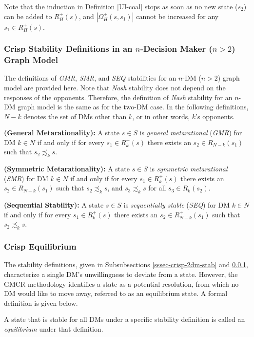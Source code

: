 Note that the induction in Definition \ref{UI-coal} stops as soon as no new state ($s_2$) can be added to $R_H^+(s)$, and $|\Omega_H^+(s, s_1)|$ cannot be increased for any $s_1 \in R_H^+(s)$.

\subsubsection{Crisp Stability Definitions in an $n$-Decision Maker ($n>2$) Graph Model}\label{sssec-crisp-n-dm-stab}

The definitions of \emph{GMR}, \emph{SMR}, and \emph{SEQ} stabilities for an $n$-DM ($n>2$) graph model are provided here. Note that \emph{Nash} stability does not depend on the responses of the opponents. Therefore, the definition of \emph{Nash} stability for an $n$-DM graph model is the same as for the two-DM case. In the following definitions, $N-k$ denotes the set of DMs other than $k$, or in other words, $k$'s opponents.

\begin{definition}\label{def-gmr}
\rm {\bf (General Metarationality):} A state $s \in S$ is \emph{general metarational} (\emph{GMR}) for DM $k \in N$ if and only if for every $s_1 \in R_k^+(s)$ there exists an $s_2 \in R_{N-k}(s_1)$ such that $s_2 \precsim_k s$.
\end{definition}

\begin{definition}\label{def-smr}
\rm {\bf (Symmetric Metarationality):} A state $s \in S$ is \emph{symmetric metarational} (\emph{SMR}) for DM $k \in N$ if and only if for every $s_1 \in R_k^+(s)$ there exists an $s_2 \in R_{N-k}(s_1)$ such that $s_2 \precsim_k s$, and $s_3 \precsim_k s$ for all $s_3 \in R_k(s_2)$.
\end{definition}

\begin{definition}\label{def-seq}
\rm {\bf (Sequential Stability):} A state $s \in S$ is \emph{sequentially stable} (\emph{SEQ}) for DM $k \in N$ if and only if for every $s_1 \in R_k^+(s)$ there exists an $s_2 \in R_{N-k}^+(s_1)$ such that $s_2 \precsim_k s$.
\end{definition}

\subsubsection{Crisp Equilibrium}

The stability definitions, given in Subsubsections \ref{sssec-crisp-2dm-stab} and \ref{sssec-crisp-n-dm-stab}, characterize a single DM's unwillingness to deviate from a state. However, the GMCR methodology identifies a state as a potential resolution, from which no DM would like to move away, referred to as an equilibrium state. A formal definition is given below.
\begin{definition}
\rm A state that is stable for all DMs under a specific stability definition is called an \emph{equilibrium} under that definition.
\end{definition}

